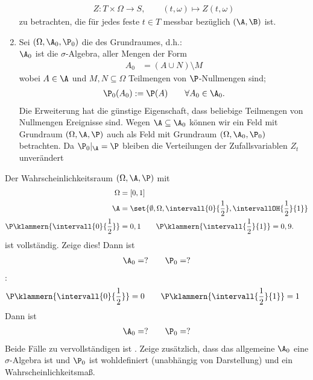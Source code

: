 \begin{bemerkungnr}
\begin{enumerate}[label=(\arabic*)]
		\begin{align*}
			Z:T\times\Omega\to S,\qquad (t,\omega)\mapsto Z(t,\omega)
		\end{align*}
		zu betrachten, die für jedes feste $t\in T$ messbar bezüglich $(\A,\B)$ ist.
		\item Sei $(\Omega,\A_0,\P_0)$ die  des Grundraumes, d.h.: \\
		$\A_0$ ist die $\sigma$-Algebra, aller Mengen der Form
		\begin{align*}
			A_0&=(A\cup N)\setminus M
		\end{align*}
		wobei $A\in\A$ und $M,N\subseteq\Omega$ Teilmengen von $\P$-Nullmengen sind; %
		\begin{align*}
			\P_0(A_0):=\P(A)\qquad\forall A_0\in\A_0.
		\end{align*}
		Die Erweiterung hat die günstige Eigenschaft, dass beliebige Teilmengen von Nullmengen Ereignisse sind.
		Wegen $\A\subseteq\A_0$ können wir ein Feld mit Grundraum $(\Omega,\A,\P)$ auch als Feld mit Grundraum $(\Omega,\A_0,\P_0)$ betrachten.
		Da $\P_0|_\A=\P$ bleiben die Verteilungen der Zufallsvariablen $Z_t$ unverändert
	\end{enumerate}
\end{bemerkungnr}

\begin{beisp}
	Der Wahrscheinlichkeitsraum $(\Omega,\A,\P)$ mit
	\begin{align*}
		\Omega&=[0,1]\\
		\A&=\set{\emptyset,\Omega,\intervall{0}{\frac{1}{2}},\intervallOH{\frac{1}{2}}{1}}\\
		\P\klammern{\intervall{0}{\frac{1}{2}}}&=0,1\qquad\P\klammern{\intervall{\frac{1}{2}}{1}}=0,9.
	\end{align*}		
	ist  vollständig. Zeige dies!
	 Dann ist
	 \begin{align*}
	 	\A_0=?\qquad\P_0=?
	 \end{align*}
	 :
	 \begin{align*}
	 	\P\klammern{\intervall{0}{\frac{1}{2}}}&=0\qquad\P\klammern{\intervall{\frac{1}{2}}{1}}=1
	 \end{align*}
	  Dann ist
	 \begin{align*}
	 	\A_0=?\qquad\P_0=?
	 \end{align*}
	 Beide Fälle zu vervollständigen ist .
	 Zeige zusätzlich, dass das allgemeine $\A_0$ eine $\sigma$-Algebra ist und $\P_0$ ist wohldefiniert (unabhängig von Darstellung) und ein Wahrscheinlichkeitsmaß.
\end{beisp}


